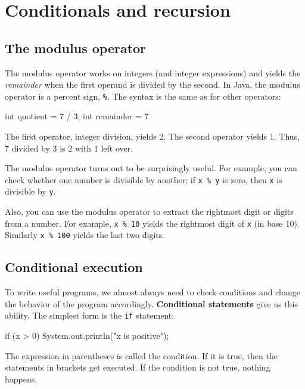 \chapter{Conditionals and recursion}
\label{chap04}
\label{condrecursion}

\section{The modulus operator}

The modulus operator works on integers (and integer expressions)
and yields the {\em remainder} when the first operand is divided
by the second.  In Java, the modulus operator is a percent sign,
{\tt \%}.  The syntax is the same as for other operators:

\begin{code}
    int quotient = 7 / 3;
    int remainder = 7 %
\end{code}
%
The first operator, integer division, yields 2.  The second
operator yields 1.  Thus, 7 divided by 3 is 2 with 1 left over.

The modulus operator turns out to be surprisingly useful.  For
example, you can check whether one number is divisible by
another: if {\tt x \% y} is zero, then {\tt x} is divisible
by {\tt y}.

Also, you can use the modulus operator to extract the rightmost
digit or digits from a number.  For example, {\tt x \% 10} yields
the rightmost digit of {\tt x} (in base 10).  Similarly
{\tt x \% 100} yields the last two digits.


\section{Conditional execution}

To write useful programs, we almost always need
to check conditions and change the behavior of the program
accordingly.  {\bf Conditional statements} give us this ability.  The
simplest form is the {\tt if} statement:

\begin{code}
    if (x > 0) {
      System.out.println("x is positive");
    }
\end{code}
%
The expression in parentheses is called the condition.
If it is true, then the statements in brackets get executed.
If the condition is not true, nothing happens.


